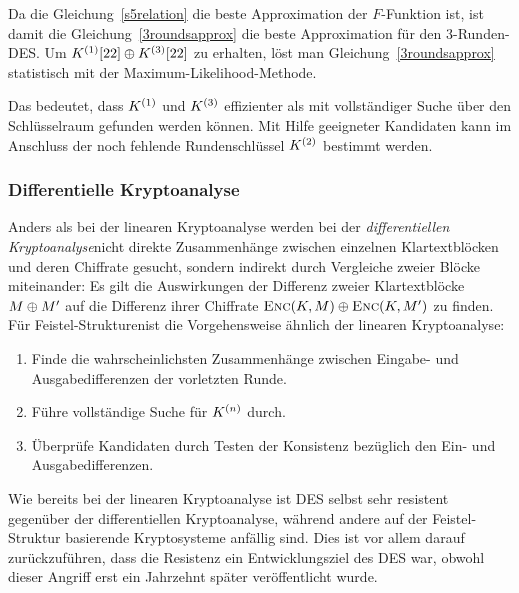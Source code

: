 Da die Gleichung~\ref{s5relation} die beste Approximation der $F$-Funktion ist, ist damit die Gleichung~\ref{3roundsapprox} die beste Approximation für den $3$-Runden-DES. Um $K^{(1)}[22] \oplus K^{(3)}[22]$ zu erhalten, löst man Gleichung~\ref{3roundsapprox} statistisch mit der Maximum-Likelihood-Methode.

Das bedeutet, dass $K^{(1)}$ und $K^{(3)}$ effizienter als mit vollständiger Suche über den Schlüsselraum gefunden werden können. Mit Hilfe geeigneter Kandidaten kann im Anschluss der noch fehlende Rundenschlüssel $K^{(2)}$ bestimmt werden.

\subsubsection{Differentielle Kryptoanalyse}
\label{sssec:diffKryptoanalyse}
Anders als bei der linearen Kryptoanalyse werden bei der \emph{differentiellen Kryptoanalyse}\indexDiffCrypt nicht direkte Zusammenhänge zwischen einzelnen Klartextblöcken und deren Chiffrate gesucht, sondern indirekt durch Vergleiche zweier Blöcke miteinander: Es gilt die Auswirkungen der Differenz zweier Klartextblöcke $M \oplus M'$ auf die Differenz ihrer Chiffrate $\textsc{Enc}(K, M) \oplus \textsc{Enc}(K, M')$ zu finden.
Für Feistel-Strukturen\indexFeistel ist die Vorgehensweise ähnlich der linearen Kryptoanalyse:
\begin{enumerate}
	\item Finde die wahrscheinlichsten Zusammenhänge zwischen Eingabe- und Ausgabedifferenzen der vorletzten Runde.
	\item Führe vollständige Suche für $K^{(n)}$ durch.
	\item Überprüfe Kandidaten durch Testen der Konsistenz bezüglich den Ein- und Ausgabedifferenzen.
\end{enumerate}

Wie bereits bei der linearen Kryptoanalyse ist DES selbst sehr resistent gegenüber der differentiellen Kryptoanalyse, während andere auf der Feistel-Struktur basierende Kryptosysteme anfällig sind. Dies ist vor
allem darauf zurückzuführen, dass die Resistenz ein Entwicklungsziel des DES war, obwohl dieser Angriff erst ein Jahrzehnt später veröffentlicht wurde.

